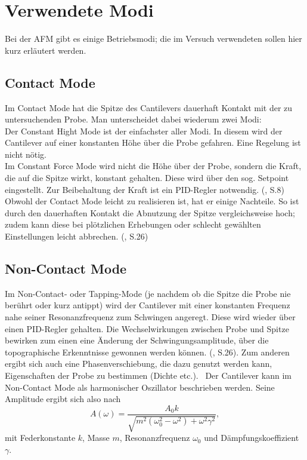 \newpage


\section{Verwendete Modi}
\label{sec:Modi}
Bei der AFM gibt es einige Betriebsmodi; die im Versuch verwendeten sollen hier kurz erläutert werden.

\subsection{Contact Mode}
Im Contact Mode hat die Spitze des Cantilevers dauerhaft Kontakt mit der zu untersuchenden Probe. Man unterscheidet dabei wiederum zwei Modi: \\
Der Constant Hight Mode ist der einfachster aller Modi. In diesem wird der Cantilever auf einer konstanten Höhe über die Probe gefahren. 
Eine Regelung ist nicht nötig. \footnotemark \\
Im Constant Force Mode wird nicht die Höhe über der Probe, sondern die Kraft, die auf die Spitze wirkt, konstant gehalten. Diese wird 
über den sog. Setpoint eingestellt. Zur Beibehaltung der Kraft ist ein PID-Regler notwendig. (\cite{Rieger2013}, S.8)\\
Obwohl der Contact Mode leicht zu realisieren ist, hat er einige Nachteile. So ist durch den dauerhaften Kontakt die Abnutzung der Spitze 
vergleichsweise hoch; zudem kann diese bei plötzlichen Erhebungen oder schlecht gewählten Einstellungen leicht abbrechen. (\cite{Vesely2017}, S.26)

\subsection{Non-Contact Mode}
Im Non-Contact- oder Tapping-Mode (je nachdem ob die Spitze die Probe nie berührt oder kurz antippt) wird der Cantilever mit einer 
konstanten Frequenz nahe seiner Resonanzfrequenz zum Schwingen angeregt. Diese wird wieder über einen PID-Regler gehalten. 
Die Wechselwirkungen zwischen Probe und Spitze bewirken zum einen eine Änderung der Schwingungsamplitude, über die topographische 
Erkenntnisse gewonnen werden können. (\cite{Vesely2017}, S.26). Zum anderen ergibt sich auch eine Phasenverschiebung, die dazu genutzt 
werden kann, Eigenschaften der Probe zu bestimmen (Dichte etc.). \footnotemark \, Der Cantilever kann im Non-Contact Mode als harmonischer Oszillator beschrieben werden. 
Seine Amplitude ergibt sich also nach 
\begin{equation*}
    A(\omega) = \frac{A_0 k}{\sqrt{m^2(\omega_0^2 - \omega^2) + \omega^2 \gamma^2}},
\end{equation*}
mit Federkonstante $k$, Masse $m$, Resonanzfrequenz $\omega_0$ und Dämpfungskoeffizient $\gamma$.
 

